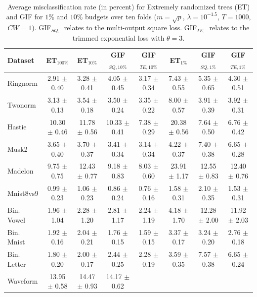 \documentclass{article}
\newcommand{\bestA}{\cellcolor{orange}}
\newcommand{\bestB}{\cellcolor{dodgerblue}}
\begin{document}
\begin{table}[t]
\caption{Average misclassification rate (in percent) for Extremely randomized 
trees (ET) and GIF for $1\%$ and $10\%$ budgets over ten folds ($m=\sqrt{p}$, 
$\lambda=10^{-1.5}$, $T=1000$, $CW=1$). GIF$_{SQ,\cdot}$ relates 
to the multi-output square loss. GIF$_{TE, \cdot}$ relates to the trimmed 
exponential loss with $\theta=3$.}
\label{tab:cls}
\begin{center}
\begin{small}
\begin{sc}
\begin{tabular}{l|c|ccc|ccc}
\hline
Dataset & ET$_{100\%}$ & ET$_{10\%}$ & GIF$_{SQ, 10\%}$ & GIF$_{TE, 10\%}$ & 
ET$_{1\%}$ & GIF$_{SQ, 1\%}$ & GIF$_{TE, 1\%}$\\
\hline 
Ringnorm &  2.91 $\pm$ 0.40 & 3.28 $\pm$ 0.41 & 4.05 $\pm$ 0.45 & \bestA 3.17 
$\pm$ 0.34 & 7.43 $\pm$ 0.55 & 5.35 $\pm$ 0.65 & \bestB 4.30 $\pm$ 0.51 \\
Twonorm & 3.13 $\pm$ 0.13 & 3.54 $\pm$ 0.18 & 3.50 $\pm$ 0.24 & \bestA 3.35 
$\pm$ 0.22 & 8.00 $\pm$ 0.57 & \bestB 3.91 $\pm$ 0.39 & 3.92 $\pm$ 0.31 \\
Hastie & 10.30 $\pm$ 0.46 & 11.78 $\pm$ 0.56 & 10.33 $\pm$ 0.41 & \bestA 7.38 
$\pm$ 0.29 & 20.38 $\pm$ 0.56 & 7.64 $\pm$ 0.50 & \bestB 6.76 $\pm$ 0.42 \\
Musk2 & 3.65 $\pm$ 0.40 & 3.70 $\pm$ 0.37 & 3.41 $\pm$ 0.34 & \bestA 3.14 $\pm$ 
0.34 & 4.22 $\pm$ 0.37 & 7.40 $\pm$ 0.38 & \bestB 6.65 $\pm$ 0.28 \\
Madelon & 9.75 $\pm$ 0.75 & 12.43 $\pm$ 0.77 & 9.18 $\pm$ 0.83 & \bestA 8.03 
$\pm$ 0.60 & 23.91 $\pm$ 1.17 & 12.55 $\pm$ 0.83 & \bestB 12.40 $\pm$ 0.76 \\
Mnist8vs9 & 0.99 $\pm$ 0.23 & 1.06 $\pm$ 0.23 & 0.86 $\pm$ 0.24 & \bestA 0.76 
$\pm$ 0.16 & 1.58 $\pm$ 0.31 & 2.10 $\pm$ 0.35 & \bestB 1.53 $\pm$ 0.31 \\
\hline
Bin. Vowel & 1.96 $\pm$ 1.04 & 2.28 $\pm$ 1.20 & 2.81 $\pm$ 1.17 & \bestA 2.24 
$\pm$ 1.19 & \bestB 4.18 $\pm$ 1.70 & 12.28 $\pm$ 2.00 & 11.92 $\pm$ 2.03 \\
Bin. Mnist & 1.92 $\pm$ 0.16 & 2.04 $\pm$ 0.21 & 1.76 $\pm$ 0.15 & \bestA 1.59 
$\pm$ 0.15 & 3.37 $\pm$ 0.17 & 3.24 $\pm$ 0.20 & \bestB 2.76 $\pm$ 0.18 \\
Bin. Letter & 1.80 $\pm$ 0.20 & \bestA 2.00 $\pm$ 0.17 & 2.44 $\pm$ 0.25 & 
2.28 $\pm$ 0.19 & \bestB 3.59 $\pm$ 0.35 & 7.57 $\pm$ 0.38 & 6.65 $\pm$ 0.24 \\
\hline
Waveform & 13.95 $\pm$ 0.58 & 14.47 $\pm$ 0.93 & \bestA 14.17 $\pm$ 0.62 & 

\end{tabular}
\end{sc}
\end{small}
\end{center}
\end{table}
\end{document}
